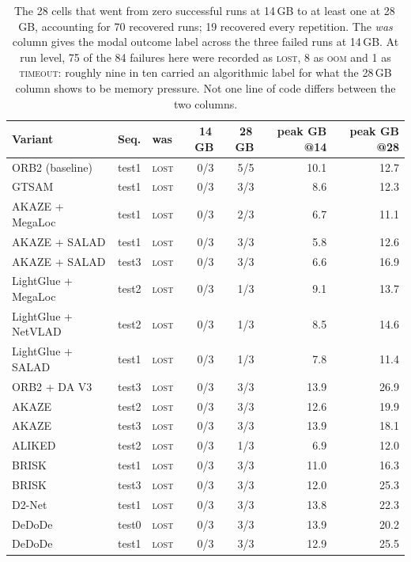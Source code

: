 \begin{table}[H]
\centering
\caption{The 28 cells that went from zero successful runs at 14\,GB to at least one at 28\,GB, accounting for 70 recovered runs; 19 recovered every repetition. The \emph{was} column gives the modal outcome label across the three failed runs at 14\,GB. At run level, 75 of the 84 failures here were recorded as \textsc{lost}, 8 as \textsc{oom} and 1 as \textsc{timeout}: roughly nine in ten carried an algorithmic label for what the 28\,GB column shows to be memory pressure. Not one line of code differs between the two columns.}
\label{tab:gen-rescued}
\footnotesize
\setlength{\tabcolsep}{4pt}
\begin{tabular}{@{}lllrrrr@{}}
\toprule
Variant & Seq. & was & 14\,GB & 28\,GB & peak GB @14 & peak GB @28 \\
\midrule
ORB2 (baseline) & test1 & \textsc{lost} & 0/3 & 5/5 & 10.1 & 12.7 \\
GTSAM & test1 & \textsc{lost} & 0/3 & 3/3 & 8.6 & 12.3 \\
AKAZE + MegaLoc & test1 & \textsc{lost} & 0/3 & 2/3 & 6.7 & 11.1 \\
AKAZE + SALAD & test1 & \textsc{lost} & 0/3 & 3/3 & 5.8 & 12.6 \\
AKAZE + SALAD & test3 & \textsc{lost} & 0/3 & 3/3 & 6.6 & 16.9 \\
LightGlue + MegaLoc & test2 & \textsc{lost} & 0/3 & 1/3 & 9.1 & 13.7 \\
LightGlue + NetVLAD & test2 & \textsc{lost} & 0/3 & 1/3 & 8.5 & 14.6 \\
LightGlue + SALAD & test1 & \textsc{lost} & 0/3 & 1/3 & 7.8 & 11.4 \\
ORB2 + DA V3 & test3 & \textsc{lost} & 0/3 & 3/3 & 13.9 & 26.9 \\
AKAZE & test2 & \textsc{lost} & 0/3 & 3/3 & 12.6 & 19.9 \\
AKAZE & test3 & \textsc{lost} & 0/3 & 3/3 & 13.9 & 18.1 \\
ALIKED & test2 & \textsc{lost} & 0/3 & 1/3 & 6.9 & 12.0 \\
BRISK & test1 & \textsc{lost} & 0/3 & 3/3 & 11.0 & 16.3 \\
BRISK & test3 & \textsc{lost} & 0/3 & 3/3 & 12.0 & 25.3 \\
D2-Net & test1 & \textsc{lost} & 0/3 & 3/3 & 13.8 & 22.3 \\
DeDoDe & test0 & \textsc{lost} & 0/3 & 3/3 & 13.9 & 20.2 \\
DeDoDe & test1 & \textsc{lost} & 0/3 & 3/3 & 12.9 & 25.5 \\

\end{tabular}
\end{table}
